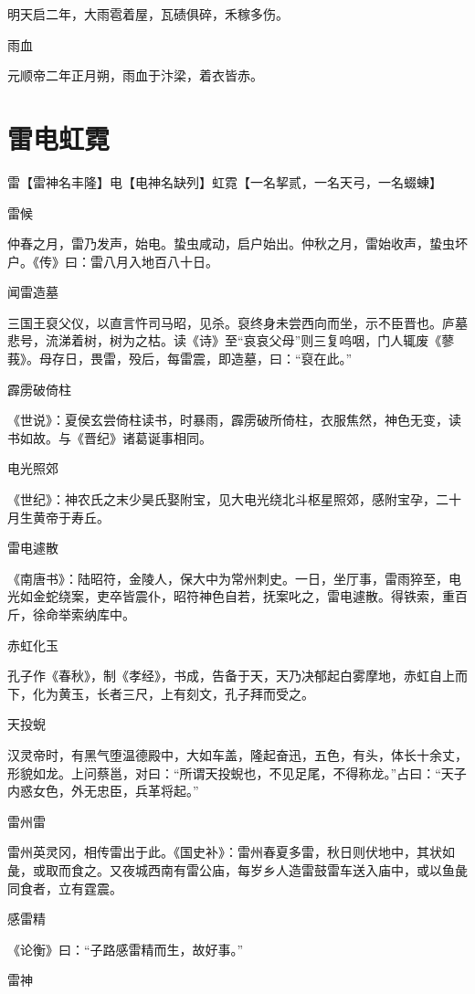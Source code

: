 \documentclass[a4paper,12pt,UTF8,twoside]{ctexbook}
\begin{document}
	明天启二年，大雨雹着屋，瓦碛俱碎，禾稼多伤。
	
	雨血
	
	元顺帝二年正月朔，雨血于汴梁，着衣皆赤。
    
	
	\chapter{雷电虹霓}
	
	雷【雷神名丰隆】电【电神名缺列】虹霓【一名挈贰，一名天弓，一名蝃蝀】
	
	雷候
	
	仲春之月，雷乃发声，始电。蛰虫咸动，启户始出。仲秋之月，雷始收声，蛰虫坏户。《传》曰：雷八月入地百八十日。
	
	闻雷造墓
	
	三国王裒父仪，以直言忤司马昭，见杀。裒终身未尝西向而坐，示不臣晋也。庐墓悲号，流涕着树，树为之枯。读《诗》至“哀哀父母”则三复呜咽，门人辄废《蓼莪》。母存日，畏雷，殁后，每雷震，即造墓，曰：“裒在此。”
	
	霹雳破倚柱
	
	《世说》：夏侯玄尝倚柱读书，时暴雨，霹雳破所倚柱，衣服焦然，神色无变，读书如故。与《晋纪》诸葛诞事相同。
	
	电光照郊
	
	《世纪》：神农氏之末少昊氏娶附宝，见大电光绕北斗枢星照郊，感附宝孕，二十月生黄帝于寿丘。
	
	雷电遽散
	
	《南唐书》：陆昭符，金陵人，保大中为常州刺史。一日，坐厅事，雷雨猝至，电光如金蛇绕案，吏卒皆震仆，昭符神色自若，抚案叱之，雷电遽散。得铁索，重百斤，徐命举索纳库中。
	
	赤虹化玉
	
	孔子作《春秋》，制《孝经》，书成，告备于天，天乃决郁起白雾摩地，赤虹自上而下，化为黄玉，长者三尺，上有刻文，孔子拜而受之。
	
	天投蜺
	
	汉灵帝时，有黑气堕温德殿中，大如车盖，隆起奋迅，五色，有头，体长十余丈，形貌如龙。上问蔡邕，对曰：“所谓天投蜺也，不见足尾，不得称龙。”占曰：“天子内惑女色，外无忠臣，兵革将起。”
	
	雷州雷
	
	雷州英灵冈，相传雷出于此。《国史补》：雷州春夏多雷，秋日则伏地中，其状如彘，或取而食之。又夜城西南有雷公庙，每岁乡人造雷鼓雷车送入庙中，或以鱼彘同食者，立有霆震。
	
	感雷精
	
	《论衡》曰：“子路感雷精而生，故好事。”
	
	雷神
	
\end{document}
